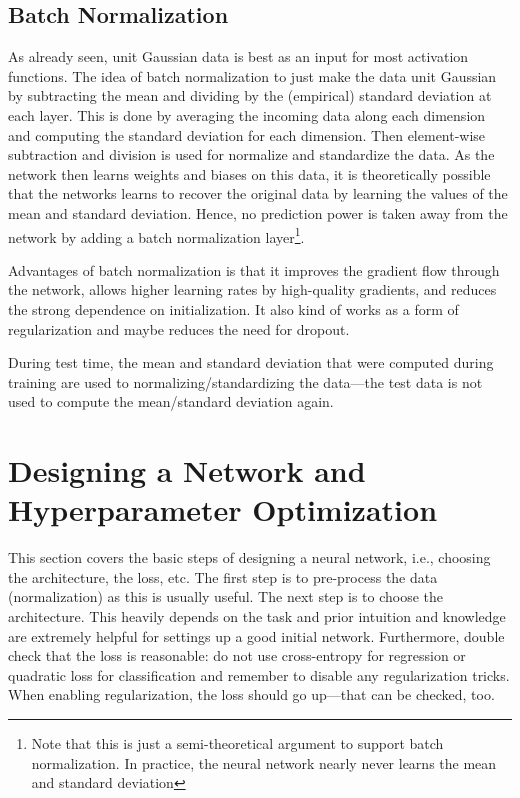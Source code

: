 		\subsection{Batch Normalization}
			As already seen, unit Gaussian data is best as an input for most activation functions. The idea of batch normalization to just make the data unit Gaussian by subtracting the mean and dividing by the (empirical) standard deviation at each layer. This is done by averaging the incoming data along each dimension and computing the standard deviation for each dimension. Then element-wise subtraction and division is used for normalize and standardize the data. As the network then learns weights and biases on this data, it is theoretically possible that the networks learns to recover the original data by learning the values of the mean and standard deviation. Hence, no prediction power is taken away from the network by adding a batch normalization layer\footnote{Note that this is just a semi-theoretical argument to support batch normalization. In practice, the neural network nearly never learns the mean and standard deviation}.

			Advantages of batch normalization is that it improves the gradient flow through the network, allows higher learning rates by high-quality gradients, and reduces the strong dependence on initialization. It also kind of works as a form of regularization and maybe reduces the need for dropout.

			During test time, the mean and standard deviation that were computed during training are used to normalizing/standardizing the data---the test data is not used to compute the mean/standard deviation again.

	\section{Designing a Network and Hyperparameter Optimization}
		This section covers the basic steps of designing a neural network, i.e., choosing the architecture, the loss, etc. The first step is to pre-process the data (normalization) as this is usually useful. The next step is to choose the architecture. This heavily depends on the task and prior intuition and knowledge are extremely helpful for settings up a good initial network. Furthermore, double check that the loss is reasonable: do not use cross-entropy for regression or quadratic loss for classification and remember to disable any regularization tricks. When enabling regularization, the loss should go up---that can be checked, too.

